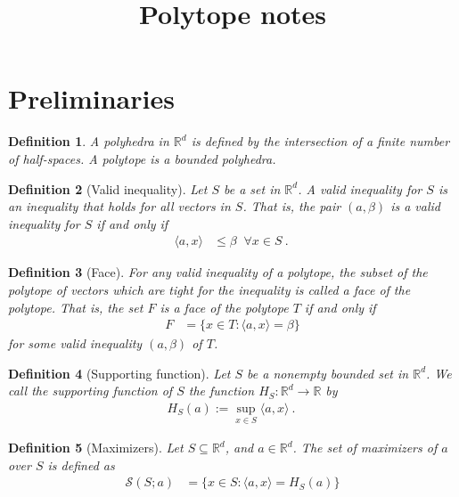 \documentclass[12pt]{article}
\title{Polytope notes}
\date{}
\newcommand{\reals}{\mathbb{R}}
\newcommand{\inprod}[2]{\langle #1, #2 \rangle}%
\newtheorem{definition}{Definition}
\begin{document}
\maketitle

\section{Preliminaries}
\begin{definition}
	A \emph{polyhedra} in $\reals^d$ is defined by the intersection of a finite number of half-spaces.
	A \emph{polytope} is a bounded polyhedra.
\end{definition}

\begin{definition}[Valid inequality]
	Let $S$ be a set in $\reals^d$.
	A \emph{valid inequality} for $S$ is an inequality that holds for all vectors in $S$.
	That is, the pair $(a,\beta)$ is a valid inequality for $S$ if and only if 
	\begin{align*}
	\inprod{a}{x} &\leq \beta \; \; \forall x \in S~.~
	\end{align*}
\end{definition}

\begin{definition}[Face]\label{def:face}
	For any valid inequality of a polytope, the subset of the polytope of vectors which are tight for the inequality is called a \emph{face} of the polytope.
	That is, the set $F$ is a face of the polytope $T$ if and only if 
	\begin{align*}
	F &= \{x \in T : \inprod{a}{x} = \beta \}
	\end{align*}
	for some valid inequality $(a, \beta)$ of $T$.
\end{definition}

\begin{definition}[Supporting function]
	Let $S$ be a nonempty bounded set in $\reals^d$.
	We call the \emph{supporting function} of $S$ the function $H_S:\reals^d \to \reals$ by
	\begin{align*}
	H_S(a) := \sup_{x \in S}\inprod{a}{x}~.~
	\end{align*} 
\end{definition}

\iffalse
\begin{definition}[Maximizers]
  Let $S \subseteq \reals^d$, and $a \in \reals^d$.
  The \emph{set of maximizers} of $a$ over $S$ is defined as
  \begin{align*}
    \mathcal{S}(S;a) &= \{x \in S : \inprod a x = H_S(a)\}
  \end{align*}
\end{definition}
\end{document}
